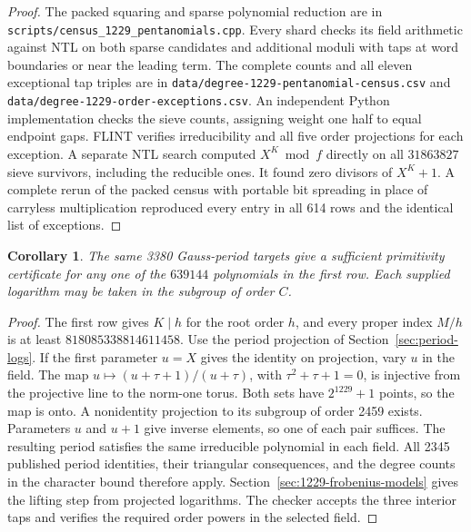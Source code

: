 \documentclass[11pt]{article}
\newtheorem{corollary}[theorem]{Corollary}
\begin{document}
\begin{proof}
The packed squaring and sparse polynomial reduction are in
\nolinkurl{scripts/census_1229_pentanomials.cpp}. Every shard checks
its field arithmetic against NTL on both sparse candidates and
additional moduli with taps at word boundaries or near the leading
term. The complete counts and all eleven exceptional tap triples
are in \nolinkurl{data/degree-1229-pentanomial-census.csv} and
\nolinkurl{data/degree-1229-order-exceptions.csv}.
An independent Python implementation checks the sieve counts, assigning
weight one half to equal endpoint gaps. FLINT verifies irreducibility
and all five order projections for each exception. A separate NTL
search computed \(X^K\bmod f\) directly on all \(31863827\) sieve
survivors, including the reducible ones. It found zero divisors of
\(X^K+1\). A complete rerun of the packed census with portable
bit spreading in place of carryless multiplication reproduced every
entry in all 614 rows and the identical list of exceptions.
\end{proof}

\begin{corollary}
The same 3380 Gauss-period targets give a sufficient primitivity
certificate for any one of the \(639144\) polynomials in the first
row. Each supplied logarithm may be taken in the subgroup of order
\(C\).
\end{corollary}
\begin{proof}
The first row gives \(K\mid h\) for the root order \(h\), and every
proper index \(M/h\) is at least \(818085338814611458\).
Use the period projection of Section~\ref{sec:period-logs}.
If the first parameter \(u=X\) gives the identity on projection,
vary \(u\) in the field. The map
\(u\mapsto (u+\tau+1)/(u+\tau)\), with \(\tau^2+\tau+1=0\),
is injective from the projective line to the norm-one torus. Both
sets have \(2^{1229}+1\) points, so the map is onto. A nonidentity
projection to its subgroup of order 2459 exists. Parameters \(u\)
and \(u+1\) give inverse elements, so one of each pair suffices.
The resulting period satisfies the same irreducible polynomial in
each field. All 2345 published period identities, their triangular
consequences, and the degree counts in the character bound therefore
apply. Section~\ref{sec:1229-frobenius-models} gives the lifting step
from projected logarithms. The checker accepts the three interior taps
and verifies the required order powers in the selected field.
\end{proof}
\end{document}
